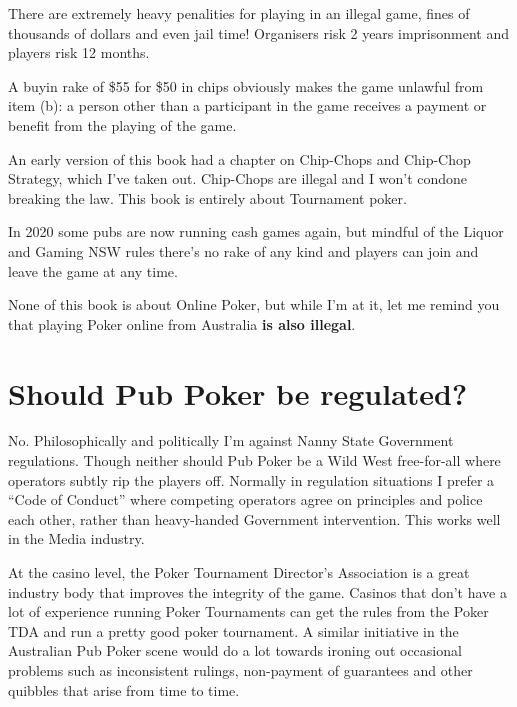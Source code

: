 There are extremely heavy penalities for playing in an illegal game,
fines of thousands of dollars and even jail time!
Organisers risk 2 years imprisonment and players risk 12 months.

A buyin rake of \$55 for \$50 in chips obviously
makes the game unlawful from item (b): a person other than a
participant in the game receives a payment or benefit from the playing
of the game.

An early version of this book had a chapter on Chip-Chops and
Chip-Chop Strategy, which I've taken out. Chip-Chops are illegal and I
won't condone breaking the law. This book is entirely about
Tournament poker.

In 2020 some pubs are now running cash games again, but mindful
of the Liquor and Gaming NSW rules there's no rake of any kind and
players can join and leave the game at any time.

None of this book is about Online Poker, but while I'm at it,
let me remind you that playing Poker online from Australia
\textbf{is also illegal}.

\section{Should Pub Poker be regulated?}

No. Philosophically and politically I'm against Nanny State
Government regulations. Though neither should Pub Poker
be a Wild West free-for-all where operators subtly rip the players
off. Normally in regulation situations I prefer a ``Code of Conduct''
where competing operators agree on principles and police each other,
rather than heavy-handed Government intervention. This works well
in the Media industry.

At the casino level, the Poker Tournament Director's Association is a
great industry body that improves the integrity of the game. Casinos
that don't have a lot of experience running Poker Tournaments can get
the rules from the Poker TDA and run a pretty good poker tournament. A
similar initiative in the Australian Pub Poker scene would do a lot
towards ironing out occasional problems such as inconsistent rulings,
non-payment of guarantees and other quibbles that arise from time to
time.


